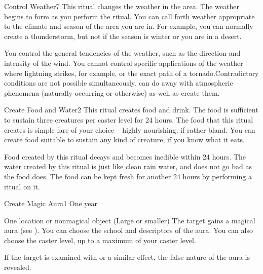 \begin{spellsection}{Control Weather}{7}
\spelldur \durext
{}
\spelleffect This ritual changes the weather in the area. The weather begins to form as you perform the ritual. You can call forth weather appropriate to the climate and season of the area you are in. For example, you can normally create a thunderstorm, but not if the season is winter or you are in a desert.
\par You control the general tendencies of the weather, such as the direction and intensity of the wind. You cannot control specific applications of the weather -- where lightning strikes, for example, or the exact path of a tornado.Contradictory conditions are not possible simultaneously.
\spellnotes {} can do away with atmospheric phenomena (naturally occurring or otherwise) as well as create them.
\end{spellsection}

\begin{spellsection}{Create Food and Water}{2}
\spellrng{\rngclose}
\spellline
\spelleffect This ritual creates food and drink. The food is sufficient to sustain three creatures per caster level for 24 hours. The food that this ritual creates is simple fare of your choice -- highly nourishing, if rather bland. You can create food suitable to sustain any kind of creature, if you know what it eats.

Food created by this ritual decays and becomes inedible within 24 hours. The water created by this ritual is just like clean rain water, and does not go bad as the food does.
\spellnotes The food can be kept fresh for another 24 hours by performing a  ritual on it.
\end{spellsection}

\begin{spellsection}{Create Magic Aura}{1}
\spelldur One year \dismissable
\begin{spelltarget}{One location or nonmagical object (Large or smaller)}
    \spelleffect The target gains a magical aura (see ). You can choose the school and descriptors of the aura. You can also choose the caster level, up to a maximum of your caster level.
\end{spelltarget}
\spellnotes If the target is examined with  or a similar effect, the false nature of the aura is revealed.
\end{spellsection}

